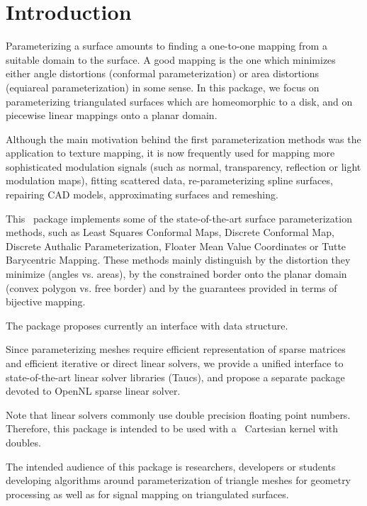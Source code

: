 \section{Introduction}

Parameterizing a surface amounts to finding a one-to-one mapping from
a suitable domain to the surface. A good mapping is the one which
minimizes either angle distortions (conformal parameterization) or
area distortions (equiareal parameterization) in some sense.  In this
package, we focus on parameterizing triangulated surfaces which are
homeomorphic to a disk, and on piecewise linear mappings onto a planar
domain.

Although the main motivation behind the first parameterization methods
was the application to texture mapping, it is now frequently used for
mapping more sophisticated modulation signals (such as normal,
transparency, reflection or light modulation maps), fitting scattered
data, re-parameterizing spline surfaces, repairing CAD models,
approximating surfaces and remeshing.

This \cgal\ package implements some of the state-of-the-art
surface parameterization methods, such as Least Squares Conformal Maps,
Discrete Conformal Map, Discrete Authalic
Parameterization, Floater Mean Value Coordinates or Tutte Barycentric
Mapping. These methods mainly distinguish by the distortion they
minimize (angles vs. areas), by the constrained border onto the
planar domain (convex polygon vs. free border) and by the guarantees
provided in terms of bijective mapping.

The package proposes currently an interface with 
data structure.

Since parameterizing meshes require efficient representation of sparse
matrices and efficient iterative or direct linear solvers, we provide
a unified interface to state-of-the-art linear solver libraries ({\sc Taucs}),
and propose a separate package devoted to OpenNL sparse
linear solver.

Note that linear solvers commonly use double precision floating point
numbers. Therefore, this package is intended to be used with a \cgal\
Cartesian kernel with doubles.

The intended audience of this package is researchers, developers or
students developing algorithms around parameterization of triangle
meshes for geometry processing as well as for signal mapping on
triangulated surfaces.

